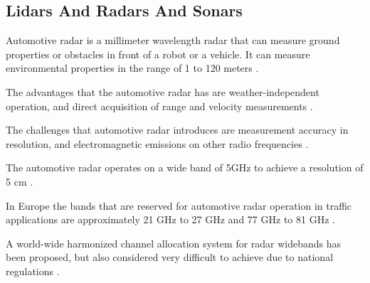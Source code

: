\documentclass[12pt,a4paper,oneside,pdftex]{report}
\begin{document}



    
\subsection{Lidars And Radars And Sonars}
\label{subsection:lidars_and_radars_and_sonars}

Automotive radar is a millimeter wavelength radar that can measure ground properties or obstacles in front of a robot or a vehicle. It can measure environmental properties in the range of 1 to 120 meters \cite{Ahtiainen12}.

The advantages that the automotive radar has are weather-independent operation, and direct acquisition of range and velocity measurements \cite{Wenger07}.

The challenges that automotive radar introduces are measurement accuracy in resolution, and electromagnetic emissions on other radio frequencies \cite{Wenger07}. 

The automotive radar operates on a wide band of 5GHz to achieve a resolution of 5 cm \cite{Wenger07}.

In Europe the bands that are reserved for automotive radar operation in traffic applications are approximately 21 GHz to 27 GHz and 77 GHz to 81 GHz \cite{Wenger07}.

A world-wide harmonized channel allocation system for radar widebands has been proposed, but also considered very difficult to achieve due to national regulations \cite{Wenger07}.
\end{document}
